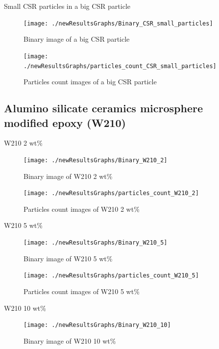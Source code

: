 \documentclass[numbers=noendperiod,chapterprefix=on]{icldt} %
\begin{document}
{\newpage
Small CSR particles in a big CSR particle

\begin{figure}[!hp]
\centering
\texttt{[image: ./newResultsGraphs/Binary\_CSR\_small\_particles]}
\caption{Binary image of a big CSR particle} \label{Binary_CSR_small_particles}
\end{figure}
\FloatBarrier

\begin{figure}[!hp]
\centering
\texttt{[image: ./newResultsGraphs/particles\_count\_CSR\_small\_particles]}
\caption{Particles count images of a big CSR particle} \label{particles_count_CSR_small_particles}
\end{figure}
\FloatBarrier

\subsection{Alumino silicate ceramics microsphere modified epoxy (W210)}
W210 2 wt\%

\begin{figure}[!hp]
\centering
\texttt{[image: ./newResultsGraphs/Binary\_W210\_2]}
\caption{Binary image of W210 2 wt\%} \label{Binary_W210_2}
\end{figure}
\FloatBarrier

\begin{figure}[!hp]
\centering
\texttt{[image: ./newResultsGraphs/particles\_count\_W210\_2]}
\caption{Particles count images of W210 2 wt\%} \label{particles_count_W210_2}
\end{figure}
\FloatBarrier

W210 5 wt\%

\begin{figure}[!hp]
\centering
\texttt{[image: ./newResultsGraphs/Binary\_W210\_5]}
\caption{Binary image of W210 5 wt\%} \label{Binary_W210_5}
\end{figure}
\FloatBarrier

\begin{figure}[!hp]
\centering
\texttt{[image: ./newResultsGraphs/particles\_count\_W210\_5]}
\caption{Particles count images of W210 5 wt\%} \label{particles_count_W210_5}
\end{figure}
\FloatBarrier

W210 10 wt\%

\begin{figure}[!hp]
\centering
\texttt{[image: ./newResultsGraphs/Binary\_W210\_10]}
\caption{Binary image of W210 10 wt\%} \label{Binary_W210_10}
\end{figure}
\FloatBarrier

}
\end{document}
